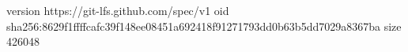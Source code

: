version https://git-lfs.github.com/spec/v1
oid sha256:8629f1ffffcafc39f148ee08451a692418f91271793dd0b63b5dd7029a8367ba
size 426048
